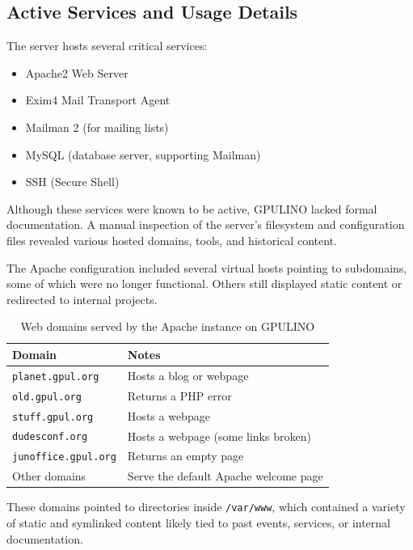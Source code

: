 \subsection*{Active Services and Usage Details}

The server hosts several critical services:
\begin{itemize}
    \item Apache2 Web Server
    \item Exim4 Mail Transport Agent
    \item Mailman 2 (for mailing lists)
    \item MySQL (database server, supporting Mailman)
    \item SSH (Secure Shell)
\end{itemize}

Although these services were known to be active, GPULINO lacked formal documentation. A manual inspection of the server's filesystem and configuration files revealed various hosted domains, tools, and historical content.

The Apache configuration included several virtual hosts pointing to subdomains, some of which were no longer functional. Others still displayed static content or redirected to internal projects.

\begin{table}[H]
  \centering
  \caption{Web domains served by the Apache instance on GPULINO}
  \label{tab:gpulino_apache_domains}
  \begin{tabular}{ll}
    \rowcolor{udcpink!25}
    \textbf{Domain} & \textbf{Notes} \\
    \hline
    \texttt{planet.gpul.org} & Hosts a blog or webpage \\
    \texttt{old.gpul.org} & Returns a PHP error \\
    \texttt{stuff.gpul.org} & Hosts a webpage \\
    \texttt{dudesconf.org} & Hosts a webpage (some links broken) \\
    \texttt{junoffice.gpul.org} & Returns an empty page \\
    Other domains & Serve the default Apache welcome page \\
  \end{tabular}
\end{table}

These domains pointed to directories inside \texttt{/var/www}, which contained a variety of static and symlinked content likely tied to past events, services, or internal documentation.

